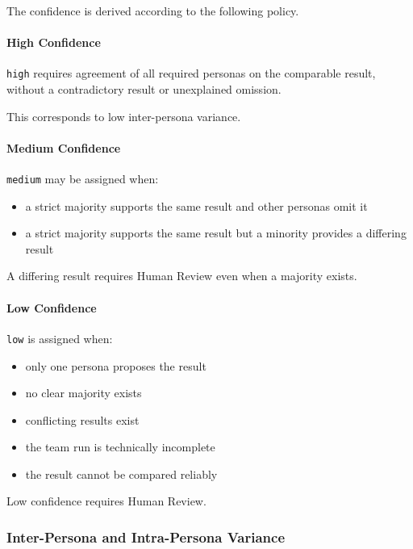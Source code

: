 The confidence is derived according to the following policy.

\hypertarget{high-confidence}{%
\paragraph{High Confidence}\label{high-confidence}}

\texttt{high} requires agreement of all required personas on the comparable result, without a contradictory result or unexplained omission.

This corresponds to low inter-persona variance.

\hypertarget{medium-confidence}{%
\paragraph{Medium Confidence}\label{medium-confidence}}

\texttt{medium} may be assigned when:

\begin{itemize}
\tightlist
\item
  a strict majority supports the same result and other personas omit it
\item
  a strict majority supports the same result but a minority provides a differing result
\end{itemize}

A differing result requires Human Review even when a majority exists.

\hypertarget{low-confidence}{%
\paragraph{Low Confidence}\label{low-confidence}}

\texttt{low} is assigned when:

\begin{itemize}
\tightlist
\item
  only one persona proposes the result
\item
  no clear majority exists
\item
  conflicting results exist
\item
  the team run is technically incomplete
\item
  the result cannot be compared reliably
\end{itemize}

Low confidence requires Human Review.

\hypertarget{inter-persona-and-intra-persona-variance}{%
\subsubsection{Inter-Persona and Intra-Persona Variance}\label{inter-persona-and-intra-persona-variance}}

